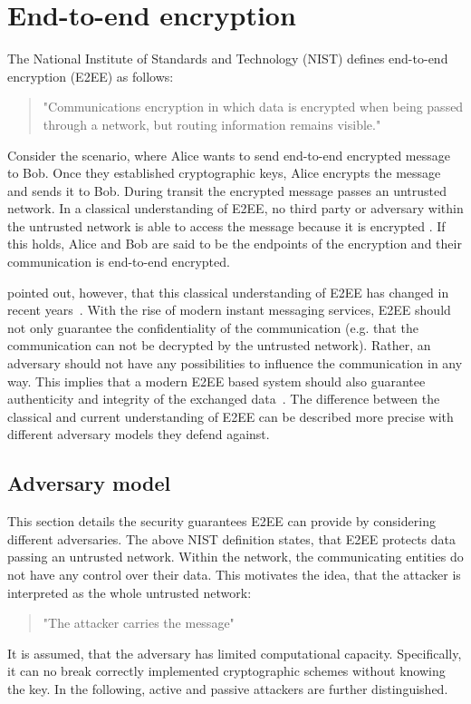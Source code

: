 \documentclass[../main.tex]{subfiles}
\begin{document}
\section{End-to-end encryption} 
\label{sec:end-to-end}

The National Institute of Standards and Technology (NIST) defines end-to-end encryption (E2EE) as follows:
\begin{quote}
"Communications encryption in which data is encrypted when being passed through a network, but routing information remains visible."~\cite[88]{Nieles2017}
\end{quote}
Consider the scenario, where Alice wants to send end-to-end encrypted message to Bob.
Once they established cryptographic keys, Alice encrypts the message and sends it to Bob.
During transit the encrypted message passes an untrusted network.
In a classical understanding of E2EE, no third party or adversary within the untrusted network is able to access the message because it is encrypted \cite{Ermoshina2016}.
If this holds, Alice and Bob are said to be the endpoints of the encryption and their communication is end-to-end encrypted.

\citeauthor{Hale2022} pointed out, however, that this classical understanding of E2EE has changed in recent years~\cite{Hale2022}. 
With the rise of modern instant messaging services, E2EE should not only guarantee the confidentiality of the communication (e.g. that the communication can not be decrypted by the untrusted network).
Rather, an adversary should not have any possibilities to influence the communication in any way.
This implies that a modern E2EE based system should also guarantee authenticity and integrity of the exchanged data~\cite{Hale2022}. 
The difference between the classical and current understanding of E2EE can be described more precise with different adversary models they defend against.

\subsection{Adversary model}
This section details the security guarantees E2EE can provide by considering different adversaries.
The above NIST definition states, that E2EE protects data passing an untrusted network.
Within the network, the communicating entities do not have any control over their data.
This motivates the idea, that the attacker is interpreted as the whole untrusted network:
\begin{quote}
    "The attacker carries the message" 
\end{quote}
It is assumed, that the adversary has limited computational capacity. 
Specifically, it can no break correctly implemented cryptographic schemes without knowing the key.
In the following, active and passive attackers are further distinguished. 
\end{document}
